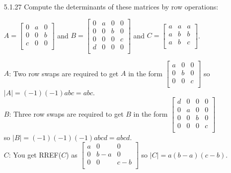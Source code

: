 \documentclass[10pt,twoside,reqno]{article}
\begin{document}
\begin{enumerate}
\item[5.1.27] Compute the determinants of these matrices by row operations: \\
\vspace{1mm}
\begin{center}
$
A=
\begin{bmatrix}
0&a&0\\
0&0&b\\
c&0&0\\
\end{bmatrix}
$
\hspace{8mm}
and
\hspace{8mm}
$
B=
\begin{bmatrix}
0&a&0&0\\
0&0&b&0\\
0&0&0&c\\
d&0&0&0\\
\end{bmatrix}
$
\hspace{8mm}
and
\hspace{8mm}
$
C=
\begin{bmatrix}
a&a&a\\
a&b&b\\
a&b&c\\
\end{bmatrix}
$. \\
\end{center}
$A$: Two row swaps are required to get $A$ in the form 
$
\begin{bmatrix}
a&0&0\\
0&b&0\\
0&0&c\\
\end{bmatrix}
$
 so $|A|=(-1)(-1)abc=abc$. \\ \vspace{1mm}
$B$: Three row swaps are required to get $B$ in the form 
$
\begin{bmatrix}
d&0&0&0\\
0&a&0&0\\
0&0&b&0\\
0&0&0&c\\
\end{bmatrix}
$
\\ \hspace{10mm} so $|B|=(-1)(-1)(-1)abcd=abcd$. \\ \vspace{1mm}
$C$: You get RREF($C$) as  
$
\begin{bmatrix}
a&0&0\\
0&b-a&0\\
0&0&c-b\\
\end{bmatrix}
$
 so $|C|=a(b-a)(c-b)$. \\
\vspace{3mm}


\end{enumerate}
\end{document}
